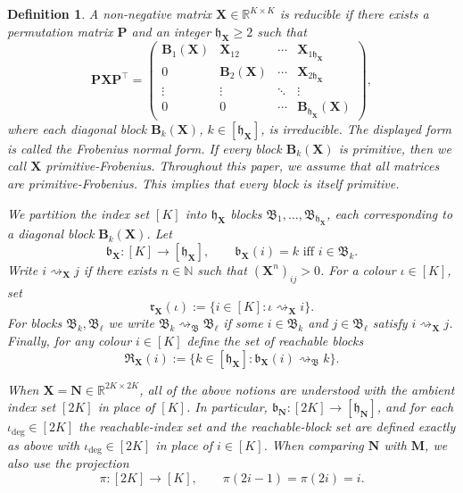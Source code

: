 \documentclass[12pt]{iopart}
\newtheorem{definition}[theorem]{Definition}
\begin{document}
\begin{definition}\label{def:frobenius-form}
A non-negative matrix $\mathbf X\in\mathbb R^{K\times K}$ is
\emph{reducible} if there exists a permutation matrix $\mathbf P$
and an integer $\mathfrak h_{\mathbf X}\ge 2$ such that
\[
  \mathbf P\mathbf X\mathbf P^\top 
  = \begin{pmatrix}
      \mathbf B_1(\mathbf X) & \mathbf X_{12}         & \cdots & \mathbf X_{1\mathfrak h_{\mathbf X}}\\
      0                      & \mathbf B_2(\mathbf X) & \cdots & \mathbf X_{2\mathfrak h_{\mathbf X}}\\
      \vdots                 & \vdots                 & \ddots & \vdots\\
      0                      & 0                      & \cdots & \mathbf B_{\mathfrak h_{\mathbf X}}(\mathbf X)
     \end{pmatrix},
\]
where each diagonal block $\mathbf B_k(\mathbf X)$,
$k\in[\mathfrak h_{\mathbf X}]$, is irreducible.
The displayed form is called the {\em Frobenius normal form}.
If every block $\mathbf B_k(\mathbf X)$ is primitive,
then we call $\mathbf X$ \emph{primitive-Frobenius}.
Throughout this paper, we assume that all matrices are {\em primitive-Frobenius.}
This implies that every block is itself primitive.

\smallskip
We partition the index set $[K]$ into
$\mathfrak h_{\mathbf X}$ blocks
$\mathfrak B_1,\ldots,\mathfrak B_{\mathfrak h_{\mathbf X}}$,
each corresponding to a diagonal block $\mathbf B_k(\mathbf X)$.
Let
\[
   \mathfrak b_{\mathbf{X}}:[K]\longrightarrow[\mathfrak h_{\mathbf X}],
   \qquad
   \mathfrak{b}_{\mathbf{X}} (i)=k
   \text{ iff } i\in\mathfrak B_k .
\]
Write $i\rightsquigarrow_{\mathbf X} j$
if there exists $n\in\mathbb{N}$ such that $(\mathbf X^n)_{ij}>0$.
For a colour $\iota\in[K]$, set
\[
   \mathfrak r_{\mathbf X}(\iota)
   :=\{ i\in[K]:\iota\rightsquigarrow_{\mathbf X} i \} .
\]
For blocks $\mathfrak B_k,\mathfrak B_\ell$ we write
$\mathfrak B_k\rightsquigarrow_{\mathfrak B}\mathfrak B_\ell$
if some $i\in\mathfrak B_k$ and $j\in\mathfrak B_\ell$
satisfy $i\rightsquigarrow_{\mathbf X} j$.
Finally, for any colour $i\in[K]$ define the set of \emph{reachable blocks}
\[
   \mathfrak R_{\mathbf X}(i)
   :=\big\{
        k\in[\mathfrak h_{\mathbf X}]
        :\mathfrak b_{\mathbf X}(i)\rightsquigarrow_{\mathfrak B} k
     \big\} .
\]

When $\mathbf X=\mathbf N\in\mathbb R^{2K\times 2K}$, all of the above notions are understood with the ambient index set $[2K]$ in place of $[K]$.
In particular, $\mathfrak b_{\mathbf N}:[2K]\to[\mathfrak h_{\mathbf N}]$, and for each $\iota_{\deg}\in[2K]$ the reachable-index set and the reachable-block set are defined exactly as above with $\iota_{\deg}\in[2K]$ in place of $i\in[K]$.
When comparing $\mathbf N$ with $\mathbf M$, we also use the projection
\[
\pi:[2K]\to[K],
\qquad
\pi(2i-1)=\pi(2i)=i.
\]
\end{definition}
\end{document}
